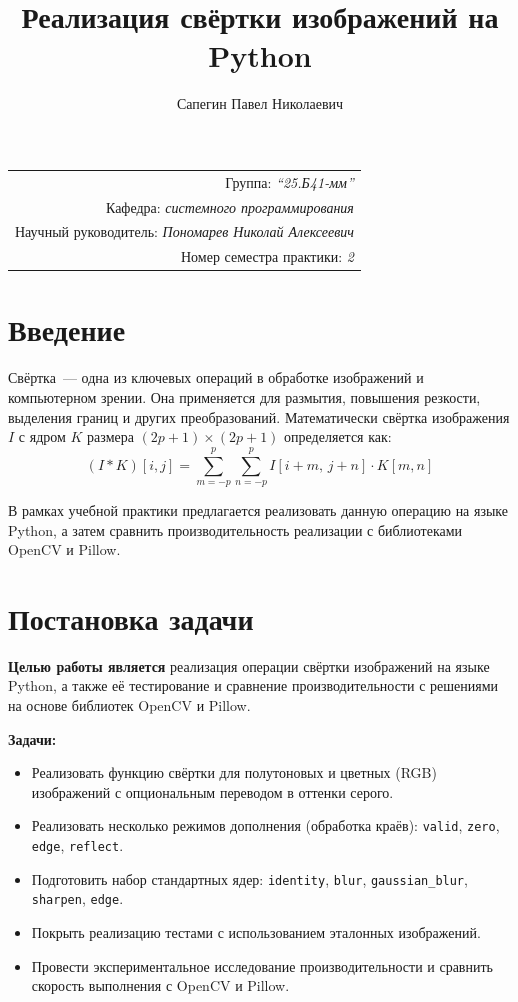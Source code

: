 \documentclass[a4paper]{article}
\title{Реализация свёртки изображений на Python}
\author{Сапегин Павел Николаевич}
\date{}
\begin{document}
\maketitle
\begin{flushright}
\begin{tabular}{r}
    Группа: \emph{\enquote{25.Б41-мм}} \\
    Кафедра: \emph{системного программирования} \\
    Научный руководитель: \emph{Пономарев Николай Алексеевич} \\
    Номер семестра практики: \emph{2} \\
\end{tabular}
\end{flushright}

\section{Введение}

Свёртка~--- одна из ключевых операций в обработке изображений и компьютерном зрении. Она применяется для размытия, повышения резкости, выделения границ и других преобразований. Математически свёртка изображения $I$ с ядром $K$ размера $(2p+1) \times (2p+1)$ определяется как:
\[
(I * K)[i, j] = \sum_{m=-p}^{p} \sum_{n=-p}^{p} I[i+m,\, j+n] \cdot K[m, n]
\]

В рамках учебной практики предлагается реализовать данную операцию на языке Python, а затем сравнить производительность реализации с библиотеками OpenCV и Pillow.

\section{Постановка задачи}

\textbf{Целью работы является} реализация операции свёртки изображений на языке Python, а также её тестирование и сравнение производительности с решениями на основе библиотек OpenCV и Pillow.

\textbf{Задачи:}
\begin{itemize}
    \item Реализовать функцию свёртки для полутоновых и цветных (RGB) изображений с опциональным переводом в оттенки серого.
    \item Реализовать несколько режимов дополнения (обработка краёв): \verb|valid|, \verb|zero|, \verb|edge|, \verb|reflect|.
    \item Подготовить набор стандартных ядер: \verb|identity|, \verb|blur|, \verb|gaussian_blur|, \verb|sharpen|, \verb|edge|.
    \item Покрыть реализацию тестами с использованием эталонных изображений.
    \item Провести экспериментальное исследование производительности и сравнить скорость выполнения с OpenCV и Pillow.
\end{itemize}
\end{document}
